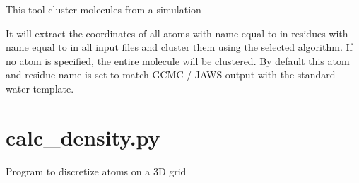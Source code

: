 \documentclass[letterpaper,10pt,english]{sphinxmanual}
\begin{document}
This tool cluster molecules from a simulation

It will extract the coordinates of all atoms with name equal to  in residues with name equal to  in all input files and cluster them using the selected algorithm.  If no atom is specified, the entire molecule will be clustered. By default this atom and residue name is set to match GCMC / JAWS output with the standard water template.


\section{calc\_density.py}
\label{\detokenize{tools:calc-density-py}}

Program to discretize atoms on a 3D grid


%
\begin{sphinxVerbatim}[commandchars=\\\{\}]
  \PYG{p}{[}\PYG{p}{]} \PYG{p}{[}  \PYG{p}{[} \PYG{p}{]}\PYG{p}{]} \PYG{p}{[} \PYG{p}{]} \PYG{p}{[} \PYG{p}{]}
                       \PYG{p}{[} \PYG{p}{]} \PYG{p}{[} \PYG{p}{]} \PYG{p}{[} \PYG{p}{]} \PYG{p}{[} \PYG{p}{]}
                       \PYG{p}{[} \PYG{p}{]} \PYG{p}{[} \PYG{p}{]} \PYG{p}{[} \PYG{p}{]}
                       \PYG{p}{[} \PYG{p}{]}
\end{sphinxVerbatim}
\end{document}
